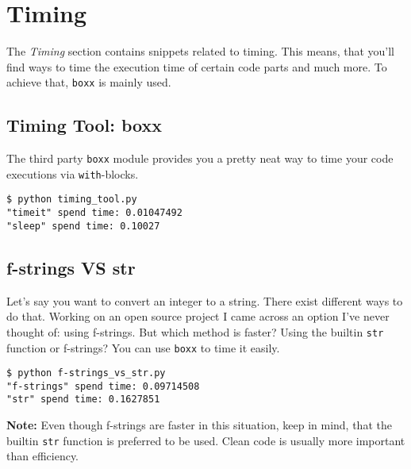 
\section{Timing}

The \textit{Timing} section contains snippets related to timing.
This means, that you'll find ways to time the execution time of certain code parts and much more.
To achieve that, \lstinline{boxx} is mainly used.


\subsection{Timing Tool: boxx}

The third party \lstinline{boxx} module provides you a pretty neat way to time your code executions via \lstinline{with}-blocks.



\begin{lstlisting}[caption=Output of timing\_tool.py]
$ python timing_tool.py
"timeit" spend time: 0.01047492
"sleep" spend time: 0.10027
\end{lstlisting}


\subsection{f-strings VS str}

Let's say you want to convert an integer to a string.
There exist different ways to do that.
Working on an open source project I came across an option I've never thought of: using f-strings.
But which method is faster?
Using the builtin \lstinline{str} function or f-strings?
You can use \lstinline{boxx} to time it easily.



\begin{lstlisting}[caption=Output of f-strings\_vs\_str.py]
$ python f-strings_vs_str.py
"f-strings" spend time: 0.09714508
"str" spend time: 0.1627851
\end{lstlisting}

\textbf{Note:} Even though f-strings are faster in this situation, keep in mind, that the builtin \lstinline{str} function is preferred to be used.
Clean code is usually more important than efficiency.
